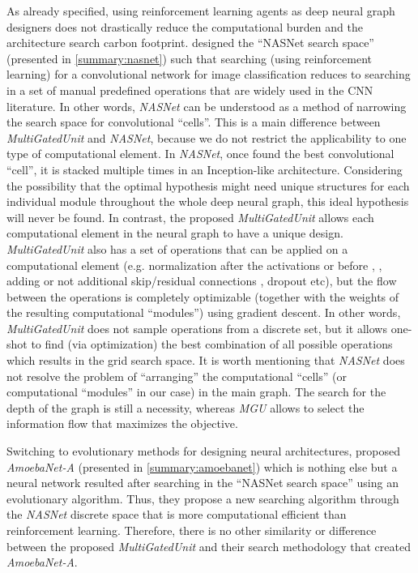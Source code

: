 \documentclass[conference]{IEEEtran}
\begin{document}
As already specified, using reinforcement learning agents  as  deep  neural  graph  designers  does  not drastically reduce the computational burden and the architecture search carbon footprint. \cite{Zoph2018} designed the “NASNet search space” (presented in \ref{summary:nasnet}) such that searching (using reinforcement learning) for a convolutional network for image classification reduces to searching in a set of manual predefined operations that are widely used in the CNN literature. In other words, \textit{NASNet} can be understood as a method of narrowing the search space for convolutional “cells''. This is a main difference between \textit{MultiGatedUnit} and \textit{NASNet}, because we do not restrict the applicability to one type of computational element. In \textit{NASNet}, once found the best convolutional “cell”, it is stacked multiple times in an Inception-like architecture. Considering the possibility that the optimal hypothesis might need unique structures for each individual module throughout the whole deep neural graph, this ideal hypothesis will never be found. In contrast, the proposed \textit{MultiGatedUnit} allows each computational element in the neural graph to have a unique design.  \textit{MultiGatedUnit} also has a set of operations that can be applied on a computational element (e.g. normalization after the activations or before \cite{Ioffe2015}, \cite{ba2016layer}, adding or not additional skip/residual connections \cite{He2016}, dropout \cite{Srivastava2014} etc), but the flow between the operations is completely optimizable (together with the weights of the resulting computational “modules”) using gradient descent. In other words, \textit{MultiGatedUnit} does not sample operations from a discrete set, but it allows one-shot to find (via optimization) the best combination of all possible operations which results in the grid search space. It is worth mentioning that \textit{NASNet} does not resolve the problem of “arranging” the computational “cells” (or computational “modules” in our case) in the main graph. The search for the depth of the graph is still a necessity, whereas \textit{MGU} allows to select the information flow that maximizes the objective. 

Switching to evolutionary methods for designing neural architectures, \cite{Real2018} proposed \textit{AmoebaNet-A} (presented in \ref{summary:amoebanet}) which is nothing else but a neural network resulted after searching in the “NASNet search space” using an evolutionary algorithm. Thus, they propose a new searching algorithm through the \textit{NASNet} discrete space that is more computational efficient than reinforcement learning. Therefore, there is no other similarity or difference between the proposed \textit{MultiGatedUnit} and their search methodology that created \textit{AmoebaNet-A}.
\end{document}
